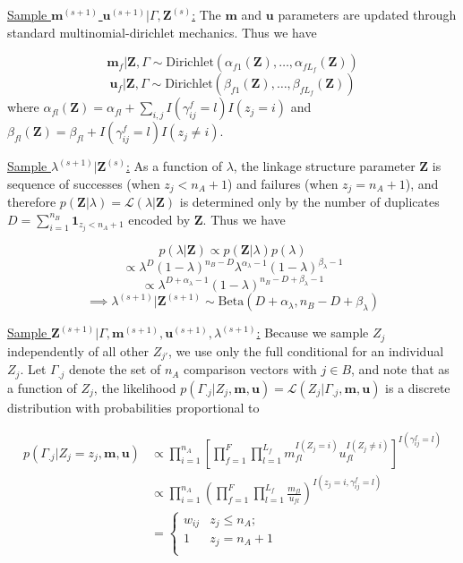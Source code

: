 \documentclass[12pt,letterpaper]{article}
\newcommand{\1}[1]{\mathbb{I}\!\left[#1\right]} %
\begin{document}
\underline{Sample $\mathbf{m}^{(s+1)}$ $\mathbf{u}^{(s+1)}|\Gamma, \mathbf{Z}^{(s)}$:}
The \(\mathbf{m}\) and \(\mathbf{u}\) parameters are updated through
standard multinomial-dirichlet mechanics. Thus we have

\[\mathbf{m}_f|\mathbf{Z}, \Gamma \sim \text{Dirichlet}(\alpha_{f1}(\mathbf{Z}), \ldots, \alpha_{fL_f}(\mathbf{Z}))\]
\[\mathbf{u}_f|\mathbf{Z}, \Gamma \sim \text{Dirichlet}(\beta_{f1}(\mathbf{Z}), \ldots, \beta_{fL_f}(\mathbf{Z}))\]
where
\(\alpha_{fl}(\mathbf{Z})= \alpha_{fl} + \sum_{i,j} I(\gamma_{ij}^f = l) I(z_j = i)\)
and
\(\beta_{fl}(\mathbf{Z})= \beta_{fl} + I(\gamma_{ij}^f = l) I(z_j \neq i)\).

\underline{Sample $\lambda^{(s+1)}|\mathbf{Z}^{(s)}$:} As a function of
\(\lambda\), the linkage structure parameter \(\mathbf{Z}\) is sequence
of successes (when \(z_j < n_A + 1\)) and failures (when
\(z_j = n_A + 1\)), and therefore
\(p(\mathbf{Z}|\lambda) = \mathcal{L}(\lambda|\mathbf{Z})\) is
determined only by the number of duplicates
\(D = \sum_{i=1}^{n_B}\mathbf{1}_{z_j < n_A + 1}\) encoded by
\(\mathbf{Z}\). Thus we have

\[p(\lambda | \mathbf{Z}) \propto p(\mathbf{Z}|\lambda)p(\lambda)\]
\[\propto \lambda^D (1-\lambda)^{n_B - D} \lambda^{\alpha_{\lambda} -1} (1-\lambda)^{\beta_{\lambda} -1}\]
\[ \propto \lambda^{D + \alpha_{\lambda} - 1} (1-\lambda)^{n_B - D + \beta_{\lambda} -1}\]
\[\implies \lambda^{(s+1)}|\mathbf{Z}^{(s+1)} \sim \text{Beta}(D + \alpha_{\lambda}, n_B - D + \beta_{\lambda})\]

\underline{Sample $\mathbf{Z}^{(s+1)}|\Gamma, \mathbf{m}^{(s+1)}, \mathbf{u}^{(s+1)}, \lambda^{(s+1)}$:}
Because we sample \(Z_j\) independently of all other \(Z_{j'}\), we use
only the full conditional for an individual \(Z_j\). Let \(\Gamma_{.j}\)
denote the set of \(n_A\) comparison vectors with \(j \in B\), and note
that as a function of \(Z_j\), the likelihood
\(p(\Gamma_{.j}|Z_j, \mathbf{m}, \mathbf{u}) = \mathcal{L}(Z_j|\Gamma_{.j}, \mathbf{m}, \mathbf{u})\)
is a discrete distribution with probabilities proportional to

\begin{align*}
	p(\Gamma_{.j}|Z_j = z_j, \mathbf{m}, \mathbf{u}) &\propto \prod_{i=1}^{n_A}\left[\prod_{f=1}^{F}\prod_{l=1}^{L_f} m_{fl}^{I(Z_j = i)}u_{fl}^{I(Z_j \neq i)}\right]^{I(\gamma_{ij}^f = l)}\\
	&\propto \prod_{i=1}^{n_A}\left(\prod_{f=1}^{F}\prod_{l=1}^{L_f} \frac{m_{fl}}{u_{fl}}\right)^{I(z_j = i, \gamma_{ij}^f = l)} \\
	&=
	\begin{cases} 
		w_{ij}  & z_j \leq n_A; \\
		1 &  z_j  = n_A + 1 \\
	\end{cases}\\
\end{align*}
\end{document}
